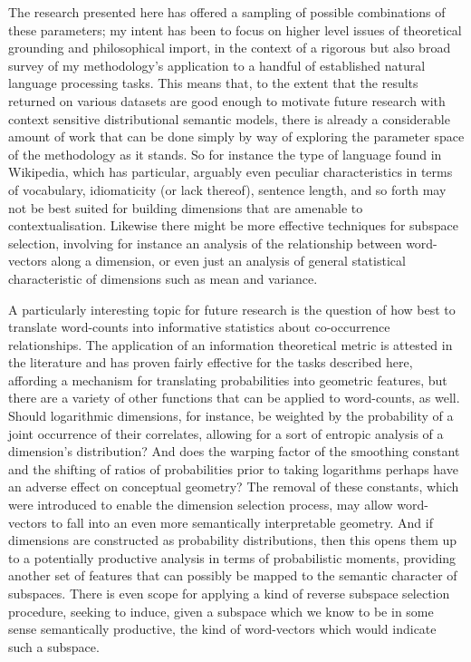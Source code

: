 \noindent The research presented here has offered a sampling of possible combinations of these parameters; my intent has been to focus on higher level issues of theoretical grounding and philosophical import, in the context of a rigorous but also broad survey of my methodology's application to a handful of established natural language processing tasks.  This means that, to the extent that the results returned on various datasets are good enough to motivate future research with context sensitive distributional semantic models, there is already a considerable amount of work that can be done simply by way of exploring the parameter space of the methodology as it stands.  So for instance the type of language found in Wikipedia, which has particular, arguably even peculiar characteristics in terms of vocabulary, idiomaticity (or lack thereof), sentence length, and so forth may not be best suited for building dimensions that are amenable to contextualisation.  Likewise there might be more effective techniques for subspace selection, involving for instance an analysis of the relationship between word-vectors along a dimension, or even just an analysis of general statistical characteristic of dimensions such as mean and variance.

A particularly interesting topic for future research is the question of how best to translate word-counts into informative statistics about co-occurrence relationships.  The application of an information theoretical metric is attested in the literature and has proven fairly effective for the tasks described here, affording a mechanism for translating probabilities into geometric features, but there are a variety of other functions that can be applied to word-counts, as well.  Should logarithmic dimensions, for instance, be weighted by the probability of a joint occurrence of their correlates, allowing for a sort of entropic analysis of a dimension's distribution?  And does the warping factor of the smoothing constant and the shifting of ratios of probabilities prior to taking logarithms perhaps have an adverse effect on conceptual geometry?  The removal of these constants, which were introduced to enable the dimension selection process, may allow word-vectors to fall into an even more semantically interpretable geometry.  And if dimensions are constructed as probability distributions, then this opens them up to a potentially productive analysis in terms of probabilistic moments, providing another set of features that can possibly be mapped to the semantic character of subspaces.  There is even scope for applying a kind of reverse subspace selection procedure, seeking to induce, given a subspace which we know to be in some sense semantically productive, the kind of word-vectors which would indicate such a subspace.

